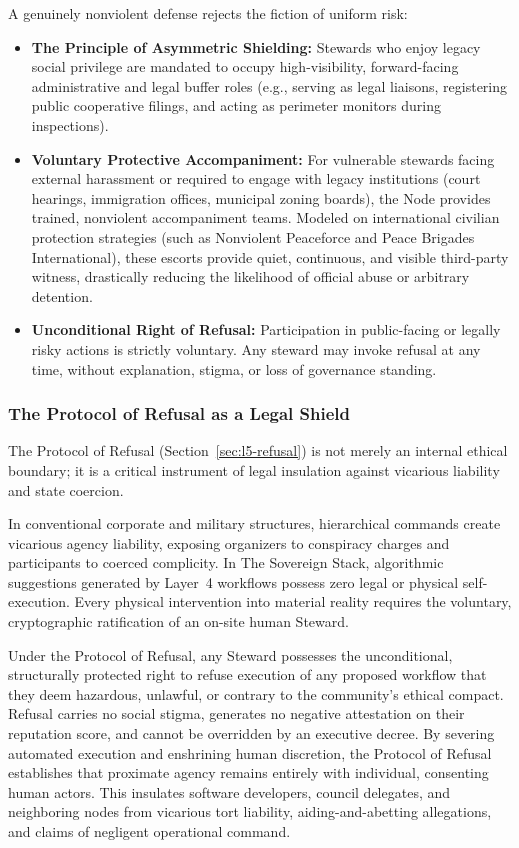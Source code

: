 A genuinely nonviolent defense rejects the fiction of uniform risk:
\begin{itemize}
    \item \textbf{The Principle of Asymmetric Shielding:} Stewards who enjoy legacy social privilege are mandated to occupy high-visibility, forward-facing administrative and legal buffer roles (e.g., serving as legal liaisons, registering public cooperative filings, and acting as perimeter monitors during inspections).
    \item \textbf{Voluntary Protective Accompaniment:} For vulnerable stewards facing external harassment or required to engage with legacy institutions (court hearings, immigration offices, municipal zoning boards), the Node provides trained, nonviolent accompaniment teams. Modeled on international civilian protection strategies (such as Nonviolent Peaceforce and Peace Brigades International), these escorts provide quiet, continuous, and visible third-party witness, drastically reducing the likelihood of official abuse or arbitrary detention.
    \item \textbf{Unconditional Right of Refusal:} Participation in public-facing or legally risky actions is strictly voluntary. Any steward may invoke refusal at any time, without explanation, stigma, or loss of governance standing.
\end{itemize}

\subsubsection{The Protocol of Refusal as a Legal Shield}

The Protocol of Refusal (Section~\ref{sec:l5-refusal}) is not merely an internal ethical boundary; it is a critical instrument of legal insulation against vicarious liability and state coercion. 

In conventional corporate and military structures, hierarchical commands create vicarious agency liability, exposing organizers to conspiracy charges and participants to coerced complicity. In The Sovereign Stack, algorithmic suggestions generated by Layer~4 workflows possess zero legal or physical self-execution. Every physical intervention into material reality requires the voluntary, cryptographic ratification of an on-site human Steward. 

Under the Protocol of Refusal, any Steward possesses the unconditional, structurally protected right to refuse execution of any proposed workflow that they deem hazardous, unlawful, or contrary to the community's ethical compact. Refusal carries no social stigma, generates no negative attestation on their reputation score, and cannot be overridden by an executive decree. By severing automated execution and enshrining human discretion, the Protocol of Refusal establishes that proximate agency remains entirely with individual, consenting human actors. This insulates software developers, council delegates, and neighboring nodes from vicarious tort liability, aiding-and-abetting allegations, and claims of negligent operational command.


